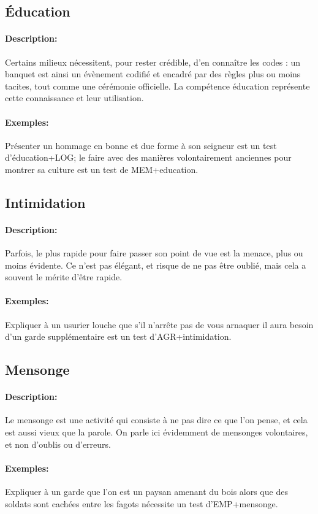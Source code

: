 \documentclass[10pt,a4paper,twocolumn]{book}
\begin{document}
\subsection{Éducation}
\paragraph{Description:}Certains milieux nécessitent, pour rester crédible, d'en connaître les codes : un banquet est ainsi un évènement codifié et encadré par des règles plus ou moins tacites, tout comme une cérémonie officielle. La compétence éducation représente cette connaissance et leur utilisation.
\paragraph{Exemples:}Présenter un hommage en bonne et due forme à son seigneur est un test d'éducation+LOG; le faire avec des manières volontairement anciennes pour montrer sa culture est un test de MEM+education.
\subsection{Intimidation}
\paragraph{Description:}Parfois, le plus rapide pour faire passer son point de vue est la menace, plus ou moins évidente. Ce n'est pas élégant, et risque de ne pas être oublié, mais cela a souvent le mérite d'être rapide.
\paragraph{Exemples:}Expliquer à un usurier louche que s'il n'arrête pas de vous arnaquer il aura besoin d'un garde supplémentaire est un test d'AGR+intimidation.
\subsection{Mensonge}
\paragraph{Description:}Le mensonge est une activité qui consiste à ne pas dire ce que l'on pense, et cela est aussi vieux que la parole. On parle ici évidemment de mensonges volontaires, et non d'oublis ou d'erreurs.
\paragraph{Exemples:}Expliquer à un garde que l'on est un paysan amenant du bois alors que des soldats sont cachées entre les fagots nécessite un test d'EMP+mensonge.
\end{document}
